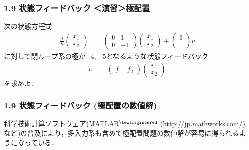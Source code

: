 \documentclass[10pt]{beamer}
\begin{document}
\begin{frame}[t]
\frametitle{1.9 状態フィードバック ＜演習＞極配置}
次の状態方程式
\begin{align*}
  \frac{d}{dt}
  \left (
  \begin{array}{c}
   x_1 \\ x_2
  \end{array}
  \right )
  & =
  \left (
  \begin{array}{cc}
   0 & 1 \\
   0 & -1
  \end{array}
  \right )
  \left (
  \begin{array}{c}
   x_1 \\ x_2
  \end{array}
  \right )
  +
  \left (
  \begin{array}{c}
   0 \\ 1
  \end{array}
  \right )
  u
\end{align*}
に対して閉ループ系の極が$-4,-5$となるような状態フィードバック
\begin{align*}
  u
  &=
  \left (
  \begin{array}{cc}
   f_1 & f_2
  \end{array}
  \right )
  \left (
  \begin{array}{c}
   x_1 \\ x_2
  \end{array}
  \right )
\end{align*}
を求めよ．
\end{frame}

\begin{frame}[t]
\frametitle{1.9 状態フィードバック (極配置の数値解)}
 

科学技術計算ソフトウェア(MATLAB$^{\tiny \textregistered}$ (http://jp.mathworks.com/)など)の普及により，多入力系も含めて極配置問題の数値解が容易に得られるようになっている．

\end{frame}
\end{document}
